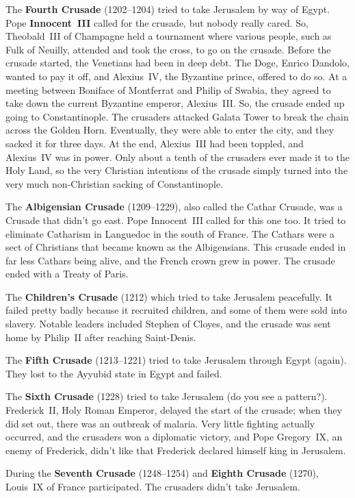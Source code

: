 The \textbf{Fourth Crusade} (1202--1204) tried to take Jerusalem by way of Egypt.
Pope \textbf{Innocent~III} called for the crusade, but nobody really cared.
So, Theobald~III of Champagne held a tournament where various people, such as Fulk of Neuilly,
attended and took the cross, to go on the crusade.
Before the crusade started, the Venetians had been in deep debt.
The Doge, Enrico Dandolo, wanted to pay it off, and Alexius~IV, the Byzantine prince, offered to do so.
At a meeting between Boniface of Montferrat and Philip of Swabia,
they agreed to take down the current Byzantine emperor, Alexius~III\@.
So, the crusade ended up going to Constantinople.
The crusaders attacked Galata Tower to break the chain across the Golden Horn.
Eventually, they were able to enter the city, and they sacked it for three days.
At the end, Alexius~III had been toppled, and Alexius~IV was in power.
Only about a tenth of the crusaders ever made it to the Holy Land,
so the very Christian intentions of the crusade simply turned into the very much non-Christian sacking of Constantinople.

The \textbf{Albigensian Crusade} (1209--1229), also called the Cathar Crusade, was a Crusade that didn't go east.
Pope Innocent~III called for this one too.
It tried to eliminate Catharism in Languedoc in the south of France.
The Cathars were a sect of Christians that became known as the Albigensians.
This crusade ended in far less Cathars being alive, and the French crown grew in power.
The crusade ended with a Treaty of Paris.

The \textbf{Children's Crusade} (1212) which tried to take Jerusalem peacefully.
It failed pretty badly because it recruited children, and some of them were sold into slavery.
Notable leaders included Stephen of Cloyes, and the crusade was sent home by Philip~II after reaching Saint-Denis.

The \textbf{Fifth Crusade} (1213--1221) tried to take Jerusalem through Egypt (again).
They lost to the Ayyubid state in Egypt and failed.

The \textbf{Sixth Crusade} (1228) tried to take Jerusalem (do you see a pattern?).
Frederick~II, Holy Roman Emperor, delayed the start of the crusade;
when they did set out, there was an outbreak of malaria.
Very little fighting actually occurred, and the crusaders won a diplomatic victory,
and Pope Gregory~IX, an enemy of Frederick, didn't like that Frederick declared himself king in Jerusalem.

During the \textbf{Seventh Crusade} (1248--1254) and \textbf{Eighth Crusade} (1270), Louis~IX of France participated.
The crusaders didn't take Jerusalem.

